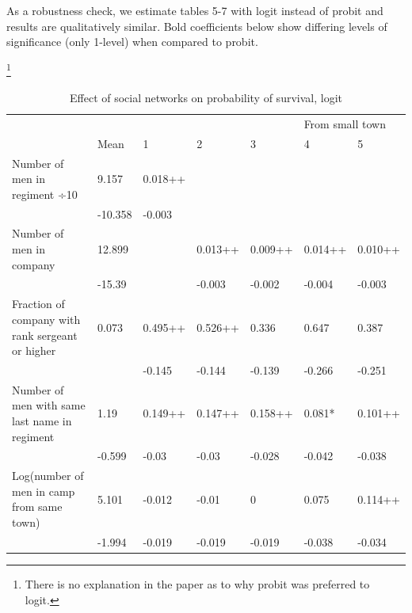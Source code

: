 \documentclass[a4paper]{report}\usepackage{graphicx, color}
\begin{document}
\begin{refsection}
As a robustness check, we estimate tables 5-7 with logit instead of probit and results are qualitatively similar. Bold coefficients below show differing levels of significance (only 1-level) when compared to probit.

\begin{table}
\caption{Effect of social networks on probability of survival, logit}\footnote{There is no explanation in the paper as to why probit was preferred to logit.}
\label{logit}
\begin{tabular}{lllllll}
\hline
                                                 &         &         &         &         & \multicolumn{2}{l}{From small town} \\
                                                 & Mean    & 1       & 2       & 3       & 4                                   & 5 \\
Number of men in regiment ÷10                    & 9.157   & 0.018++ &         &         &                                     &  \\
                                                 & -10.358 & -0.003  &         &         &                                     &  \\
Number of men in company                         & 12.899  &         & 0.013++ & 0.009++ & 0.014++                             & 0.010++ \\
                                                 & -15.39  &         & -0.003  & -0.002  & -0.004                              & -0.003 \\
Fraction of company with rank sergeant or higher & 0.073   & 0.495++ & 0.526++ & 0.336   & 0.647                               & 0.387 \\
                                                 &         & -0.145  & -0.144  & -0.139  & -0.266                              & -0.251 \\
Number of men with same last name in regiment    & 1.19    & 0.149++ & 0.147++ & 0.158++ & 0.081*                              & 0.101++ \\
                                                 & -0.599  & -0.03   & -0.03   & -0.028  & -0.042                              & -0.038 \\
Log(number of men in camp from same town)        & 5.101   & -0.012  & -0.01   & 0       & 0.075                               & 0.114++ \\
                                                 & -1.994  & -0.019  & -0.019  & -0.019  & -0.038                              & -0.034 \\

\end{tabular}
\end{table}
\end{refsection}
\end{document}

